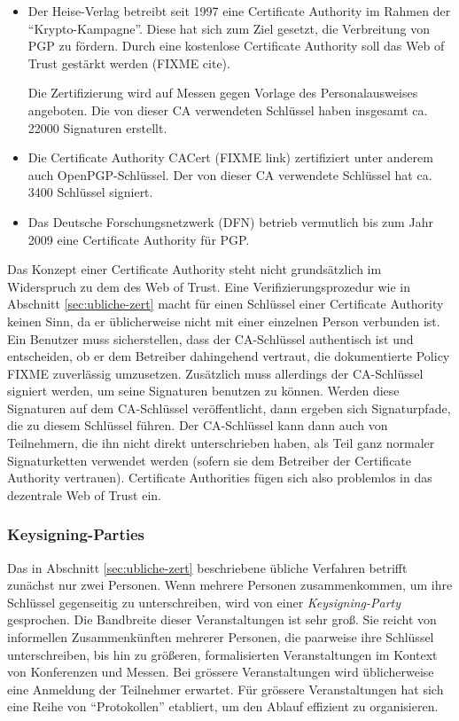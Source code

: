 \begin{itemize}
\item Der Heise-Verlag betreibt seit 1997 eine Certificate Authority
  im Rahmen der ``Krypto-Kampagne''. Diese hat sich zum Ziel gesetzt,
  die Verbreitung von PGP zu fördern. Durch eine kostenlose
  Certificate Authority soll das Web of Trust gestärkt werden (FIXME
  cite).

  Die Zertifizierung wird auf Messen gegen Vorlage des
  Personalausweises angeboten. Die von dieser CA verwendeten
  Schlüssel haben insgesamt ca. 22000 Signaturen erstellt.
\item Die Certificate Authority CACert (FIXME link) zertifiziert unter
  anderem auch OpenPGP-Schlüssel. Der von dieser CA verwendete
  Schlüssel hat ca. 3400 Schlüssel signiert.
\item Das Deutsche Forschungsnetzwerk (DFN) betrieb vermutlich bis zum
  Jahr 2009 eine Certificate Authority für PGP.
\end{itemize}

Das Konzept einer Certificate Authority steht nicht grundsätzlich im
Widerspruch zu dem des Web of Trust. Eine Verifizierungsprozedur wie
in Abschnitt \ref{sec:ubliche-zert} macht für einen Schlüssel
einer Certificate Authority keinen Sinn, da er üblicherweise nicht
mit einer einzelnen Person verbunden ist. Ein Benutzer muss
sicherstellen, dass der CA-Schlüssel authentisch ist und
entscheiden, ob er dem Betreiber dahingehend vertraut, die
dokumentierte Policy FIXME zuverlässig umzusetzen. Zusätzlich muss
allerdings der CA-Schlüssel signiert werden, um seine Signaturen
benutzen zu können. Werden diese Signaturen auf dem CA-Schlüssel
veröffentlicht, dann ergeben sich Signaturpfade, die zu diesem
Schlüssel führen. Der CA-Schlüssel kann dann auch von
Teilnehmern, die ihn nicht direkt unterschrieben haben, als Teil ganz
normaler Signaturketten verwendet werden (sofern sie dem Betreiber der
Certificate Authority vertrauen). Certificate Authorities fügen sich
also problemlos in das dezentrale Web of Trust ein.

\subsubsection{Keysigning-Parties}
\label{sec:keysigning-parties}

Das in Abschnitt \ref{sec:ubliche-zert} beschriebene übliche
Verfahren betrifft zunächst nur zwei Personen. Wenn mehrere Personen
zusammenkommen, um ihre Schlüssel gegenseitig zu unterschreiben,
wird von einer \emph{Keysigning-Party} gesprochen. Die Bandbreite
dieser Veranstaltungen ist sehr groß. Sie reicht von informellen
Zusammenkünften mehrerer Personen, die paarweise ihre Schlüssel
unterschreiben, bis hin zu größeren, formalisierten Veranstaltungen
im Kontext von Konferenzen und Messen. Bei grössere Veranstaltungen
wird üblicherweise eine Anmeldung der Teilnehmer erwartet. Für
grössere Veranstaltungen hat sich eine Reihe von ``Protokollen''
etabliert, um den Ablauf effizient zu organisieren\cite{Brennen2008}.

